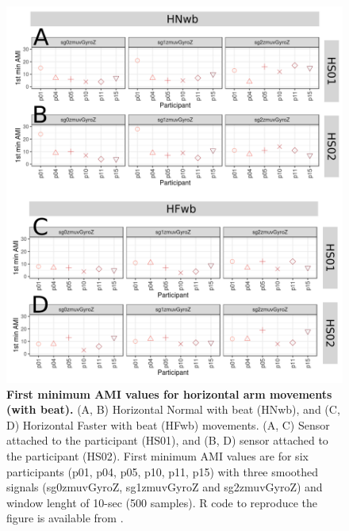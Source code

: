 \begin{figure}[!h]
\centering
\includegraphics[width=1.0\textwidth]{ami_Hwb_w10}
	\caption{
	{\bf First minimum AMI values for horizontal arm movements (with beat).}
		(A, B) Horizontal Normal with beat (HNwb), and 
		(C, D) Horizontal Faster with beat (HFwb) movements.
		(A, C) Sensor attached to the participant (HS01), and
		(B, D) sensor attached to the participant (HS02).
		First minimum AMI values are for six participants 
		(p01, p04, p05, p10, p11, p15) with three smoothed 
		signals (sg0zmuvGyroZ, sg1zmuvGyroZ and sg2zmuvGyroZ) and 
		window lenght of 10-sec (500 samples).
		R code to reproduce the figure is available 
		from \cite{hwum2018}.
        }
    \label{fig:amiHwb}
\end{figure}

